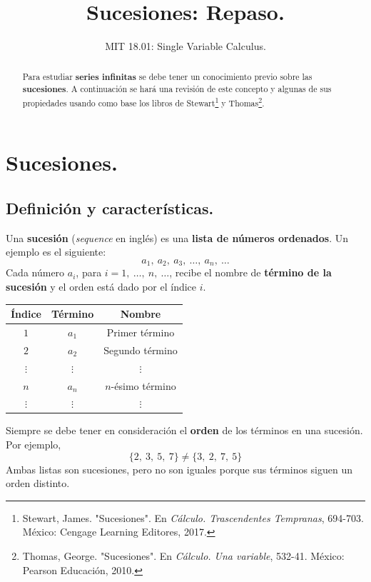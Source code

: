 \documentclass[12pt]{article}
\title{Sucesiones: Repaso.}
\author{MIT 18.01: Single Variable Calculus.}
\date{}
\begin{document}
\maketitle

\begin{abstract}
\noindent Para estudiar \textbf{series infinitas} se debe tener un conocimiento previo sobre las \textbf{sucesiones}. A continuación se hará una revisión de este concepto y algunas de sus propiedades usando como base los libros de Stewart\footnote{Stewart, James. "Sucesiones". En \textit{Cálculo. Trascendentes Tempranas}, 694-703. México: Cengage Learning Editores, 2017.} y Thomas\footnote{Thomas, George. "Sucesiones". En \textit{Cálculo. Una variable}, 532-41. México: Pearson Educación, 2010.}.
\end{abstract}


\section{Sucesiones.}

\subsection{Definición y características.}

Una \textbf{sucesión} (\textit{sequence} en inglés) es una \textbf{lista de números ordenados}. Un ejemplo es el siguiente:
\[
  a_{1}, \ a_{2}, \ a_{3}, \ \ldots, \ a_{n}, \ \ldots
\]
Cada número $a_{i}$, para $i = 1, \ \ldots, \ n, \ \ldots$, recibe el nombre de \textbf{término de la sucesión} y el orden está dado por el índice $i$.

\begin{table}[hbt!]
\centering

\begin{tabular}{c c c}
\hline
Índice & Término & Nombre \\
\hline
$1$ & $a_{1}$ & Primer término \\
$2$ & $a_{2}$ & Segundo término \\
$\vdots$ & $\vdots$ & $\vdots$ \\
$n$ & $a_{n}$ & $n$-ésimo término \\
$\vdots$ & $\vdots$ & $\vdots$ \\
\hline
\end{tabular}

\end{table}

Siempre se debe tener en consideración el \textbf{orden} de los términos en una sucesión. Por ejemplo,
\[
  \{2, \ 3, \ 5, \ 7\} \neq \{3, \ 2, \ 7, \ 5\}
\]
Ambas listas son sucesiones, pero no son iguales porque sus términos siguen un orden distinto.
\end{document}
